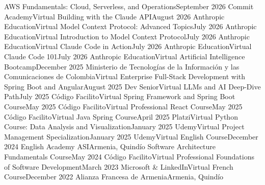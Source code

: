 \resumeSubHeadingListStart
    \resumeSubheading
        {AWS Fundamentals: Cloud, Serverless, and Operations}{September 2026}
        {Commit Academy}{Virtual}
    \resumeSubheading
        {Building with the Claude API}{August 2026}
        {Anthropic Education}{Virtual}
    \resumeSubheading
        {Model Context Protocol: Advanced Topics}{July 2026}
        {Anthropic Education}{Virtual}
    \resumeSubheading
        {Introduction to Model Context Protocol}{July 2026}
        {Anthropic Education}{Virtual}
    \resumeSubheading
        {Claude Code in Action}{July 2026}
        {Anthropic Education}{Virtual}
    \resumeSubheading
        {Claude Code 101}{July 2026}
        {Anthropic Education}{Virtual}
    \resumeSubheading
        {Artificial Intelligence Bootcamp}{December 2025}
        {Ministerio de Tecnologías de la Información y las Comunicaciones de Colombia}{Virtual}
    \resumeSubheading
        {Enterprise Full-Stack Development with Spring Boot and Angular}{August 2025}
        {Dev Senior}{Virtual}
    \resumeSubheading
        {LLMs and AI Deep-Dive Path}{July 2025}
        {Código Facilito}{Virtual}
    \resumeSubheading
        {Spring Framework and Spring Boot Course}{May 2025}
        {Código Facilito}{Virtual}
    \resumeSubheading
        {Professional React Course}{May 2025}
        {Código Facilito}{Virtual}
    \resumeSubheading
        {Java Spring Course}{April 2025}
        {Platzi}{Virtual}
    \resumeSubheading
        {Python Course: Data Analysis and Visualization}{January 2025}
        {Udemy}{Virtual}
    \resumeSubheading
        {Project Management Specialization}{January 2025}
        {Udemy}{Virtual}
    \resumeSubheading
        {English Course}{December 2024}
        {English Academy ASI}{Armenia, Quindío}
    \resumeSubheading
        {Software Architecture Fundamentals Course}{May 2024}
        {Código Facilito}{Virtual}
    \resumeSubheading
        {Professional Foundations of Software Development}{March 2023}
        {Microsoft \& LinkedIn}{Virtual}
    \resumeSubheading
        {French Course}{December 2022}
        {Alianza Francesa de Armenia}{Armenia, Quindío}
\resumeSubHeadingListEnd
